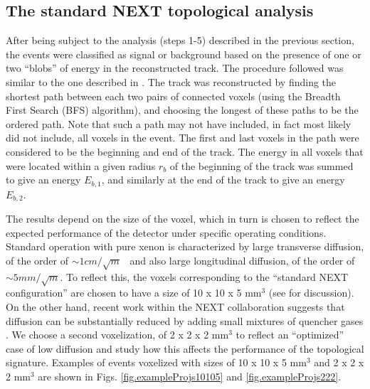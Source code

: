 \documentclass[a4paper,11pt]{article}
\begin{document}
\subsection{The standard NEXT topological analysis}\label{ssec:TopologicalAnalysis}
After being subject to the analysis (steps 1-5) described in the previous section, the events were classified as signal or background based on the presence of one or two ``blobs'' of energy in the
reconstructed track.  The procedure followed was similar to the one described in \cite{NEXT_topology, Martin-Albo:2015rhw}.  The track was reconstructed by finding the shortest path between each two 
pairs of connected voxels (using the Breadth First Search (BFS) algorithm), and choosing the longest of these paths to be the ordered path.  Note that such a path may not have included, 
in fact most likely did not include, all voxels in the event.  The first and last voxels in the path
were considered to be the beginning and end of the track.  The energy in all voxels that were located within a given radius $r_b$ of the beginning of the track was summed to give
an energy $E_{b,1}$, and similarly at the end of the track to give an energy $E_{b,2}$.  

The results depend on the size of the voxel, which in turn is chosen to reflect the expected performance of the detector under specific operating conditions. Standard operation with pure xenon is characterized by large transverse diffusion, of the order of $\sim 1 cm/\sqrt{m}$~ and also large longitudinal diffusion, of the order of  $\sim 5 mm/\sqrt{m}$. To reflect this, the voxels corresponding to the ``standard NEXT configuration'' are chosen to have a size of 10 x 10 x 5 mm$^3$ (see \cite{MartinAlbo_thesis} for discussion). On the other hand, recent work within the NEXT collaboration suggests that diffusion can be substantially reduced by adding small mixtures of quencher gases \cite{NEXT_BFIELD}. We choose a second voxelization, of 2 x 2 x 2 mm$^3$ to reflect an ``optimized'' case of low diffusion and study how this affects the performance of the topological signature.  Examples of events voxelized with sizes of 10 x 10 x 5 mm$^3$ and
2 x 2 x 2 mm$^3$ are shown in Figs. \ref{fig.exampleProjs10105} and \ref{fig.exampleProjs222}.
\end{document}
